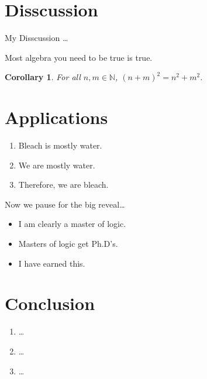 \documentclass[aspectratio=169]{beamer}	%
\newcommand{\N}{\mathbb{N}}
\theoremstyle{plain}
\newtheorem{cor}{Corollary}[section]
\theoremstyle{definition}
\theoremstyle{remark}
\numberwithin{equation}{section}
\begin{document}
\section{Disscussion}



\begin{frame}
My Disscussion \dots
\end{frame}



\begin{frame}
Most algebra you need to be true is true.
\begin{cor}
For all $n,m \in \N$, $(n+m)^2= n^2 + m^2$.
\end{cor}
\end{frame}



\section{Applications}



\begin{frame}
	\begin{enumerate}[1.]
	\item Bleach is mostly water. \pause
	\item We are mostly water. \pause
	\item Therefore, we are bleach.
	\end{enumerate} \vspace{0.5cm}

Now we pause for the big reveal\dots \pause \vspace{0.3cm}

	\begin{itemize}
	\item I am clearly a master of logic.
	\item Masters of logic get Ph.D's.
	\item I have earned this.
	\end{itemize}
\end{frame}




\section{Conclusion}



\begin{frame}
	\begin{enumerate}[1]
	\item \dots 
	\item \dots 
	\item \dots
	\end{enumerate} \vspace{0.5cm}
\end{frame}
\end{document}
